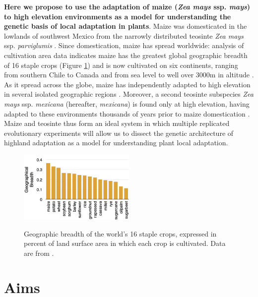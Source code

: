 {\bf Here we propose to use the adaptation of maize (\emph{Zea mays} ssp. \emph{mays}) to high elevation environments as a model for understanding the genetic basis of local adaptation in plants}.  Maize was domesticated in the lowlands of southwest Mexico from the narrowly distributed teosinte \emph{Zea mays} ssp. \emph{parviglumis} \citep[hereafter, \emph{parviglumis};][]{Matsuoka2002}. Since domestication, maize has spread worldwide: analysis of cultivation area data indicates maize has the greatest global geographic breadth of 16 staple crops (Figure \ref{fig:breadth}) and is now cultivated on six continents, ranging from southern Chile to Canada and from sea level to well over 3000m in altitude \citep{tenaillon2011european}. As it spread across the globe, maize has independently adapted to high elevation in several isolated geographic regions \citep{vanheerwaarden2011a}.  Moreover, a second teosinte subspecies \emph{Zea mays} ssp. \emph{mexicana} (hereafter, \emph{mexicana}) is found only at high elevation, having adapted to these environments thousands of years prior to maize domestication \citep{Ross-Ibarra2009a, hufford2012inferences}. Maize and teosinte thus form an ideal system in which multiple replicated evolutionary experiments will allow us to dissect the genetic architecture of highland adaptation as a model for understanding plant local adaptation.

\begin{figure}
  \centering
  \caption{Geographic breadth of the world's 16 staple crops, expressed in percent of land surface area in which each crop is cultivated. Data are from \citet{monfreda2008farming}. } 
   \includegraphics[width=0.5\textwidth]{breadth.pdf}
\label{fig:breadth}
\end{figure}

\section*{Aims}

